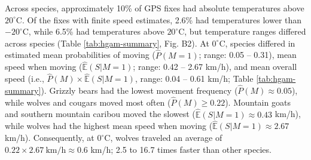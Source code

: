 \documentclass[
  12pt,
]{article}
\begin{document}
\noindent Across species, approximately 10\% of GPS fixes had absolute temperatures above \(20^\circ\)C. Of the fixes with finite speed estimates, 2.6\% had temperatures lower than \(-20^\circ\)C, while 6.5\% had temperatures above \(20^\circ\)C, but temperature ranges differed across species (Table \ref{tab:hgam-summary}, Fig. B2). At \(0^\circ\)C, species differed in estimated mean probabilities of moving (\(\hat P(M = 1)\); range: 0.05 -- 0.31), mean speed when moving (\(\hat {\mathbb E}(S|M=1)\); range: 0.42 -- 2.67 km/h), and mean overall speed (i.e., \(\hat P(M) \times \hat {\mathbb E}(S|M=1)\), range: 0.04 -- 0.61 km/h; Table \ref{tab:hgam-summary}). Grizzly bears had the lowest movement frequency (\(\hat P(M) \approx 0.05\)), while wolves and cougars moved most often (\(\hat P(M) \ge 0.22\)). Mountain goats and southern mountain caribou moved the slowest (\(\hat{\mathbb E}(S|M = 1) \approx 0.43\) km/h), while wolves had the highest mean speed when moving (\(\hat{\mathbb E}(S|M = 1) \approx 2.67\) km/h). Consequently, at \(0^\circ\)C, wolves traveled an average of \(0.22 \times 2.67~\text{km/h} \approx 0.6\) km/h; 2.5 to 16.7 times faster than other species.

\scriptsize
\end{document}
